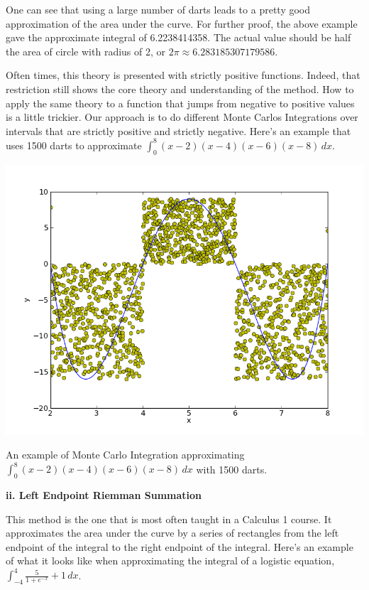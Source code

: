 \documentclass[12pt]{article}
\newcommand{\newLine}{\vspace{5mm}}
\newcommand{\nextsubsection}[1]{\newLine \noindent \large \textbf{#1} \normalsize}
\newcommand{\integral}[3]{\text{$\int^{#2}_{#1} #3\,dx$}}
\begin{document}
One can see that using a large number of darts leads to a pretty good approximation of the area under the curve. For further proof, the above example gave the approximate integral of 6.2238414358. The actual value should be half the area of circle with radius of 2, or $2\pi \approx 6.283185307179586$.

Often times, this theory is presented with strictly positive functions. Indeed, that restriction still shows the core theory and understanding of the method. How to apply the same theory to a function that jumps from negative to positive values is a little trickier. Our approach is to do different Monte Carlos Integrations over intervals that are strictly positive and strictly negative. Here's an example that uses 1500 darts to approximate $\integral{0}{8}{(x-2)(x-4)(x-6)(x-8)}$.

\begin{center} \includegraphics[scale = 0.5]{polynomialMonteCarlo.png} 

\small An example of Monte Carlo Integration approximating $\integral{0}{8}{(x-2)(x-4)(x-6)(x-8)}$ with 1500 darts. \normalsize
\end{center}

\nextsubsection{ii. Left Endpoint Riemman Summation}

\newLine This method is the one that is most often taught in a Calculus 1 course. It approximates the area under the curve by a series of rectangles from the left endpoint of the integral to the right endpoint of the integral. Here's an example of what it looks like when approximating the integral of a logistic equation, $\displaystyle\int^{4}_{-4} \frac{5}{1 +e^{-x}}+1\,dx$.
\end{document}
